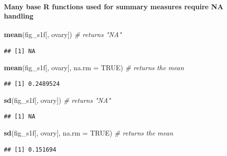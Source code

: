 \documentclass[]{book}
\newenvironment{Shaded}{\begin{snugshade}}{\end{snugshade}}
\newcommand{\CommentTok}[1]{\textcolor[rgb]{0.56,0.35,0.01}{\textit{#1}}}
\newcommand{\DataTypeTok}[1]{\textcolor[rgb]{0.13,0.29,0.53}{#1}}
\newcommand{\KeywordTok}[1]{\textcolor[rgb]{0.13,0.29,0.53}{\textbf{#1}}}
\newcommand{\NormalTok}[1]{#1}
\newcommand{\OtherTok}[1]{\textcolor[rgb]{0.56,0.35,0.01}{#1}}
\let\oldparagraph\paragraph
\renewcommand{\paragraph}[1]{\oldparagraph{#1}\mbox{}}
\begin{document}
\hypertarget{many-base-r-functions-used-for-summary-measures-require-na-handling}{%
\paragraph{Many base R functions used for summary measures require NA handling}\label{many-base-r-functions-used-for-summary-measures-require-na-handling}}

\begin{Shaded}
\begin{Highlighting}[]
\KeywordTok{mean}\NormalTok{(fig_s1f[, ovary]) }\CommentTok{# returns "NA"}
\end{Highlighting}
\end{Shaded}

\begin{verbatim}
## [1] NA
\end{verbatim}

\begin{Shaded}
\begin{Highlighting}[]
\KeywordTok{mean}\NormalTok{(fig_s1f[, ovary], }\DataTypeTok{na.rm =} \OtherTok{TRUE}\NormalTok{) }\CommentTok{# returns the mean}
\end{Highlighting}
\end{Shaded}

\begin{verbatim}
## [1] 0.2489524
\end{verbatim}

\begin{Shaded}
\begin{Highlighting}[]
\KeywordTok{sd}\NormalTok{(fig_s1f[, ovary]) }\CommentTok{# returns "NA"}
\end{Highlighting}
\end{Shaded}

\begin{verbatim}
## [1] NA
\end{verbatim}

\begin{Shaded}
\begin{Highlighting}[]
\KeywordTok{sd}\NormalTok{(fig_s1f[, ovary], }\DataTypeTok{na.rm =} \OtherTok{TRUE}\NormalTok{) }\CommentTok{# returns the mean}
\end{Highlighting}
\end{Shaded}

\begin{verbatim}
## [1] 0.151694
\end{verbatim}
\end{document}
